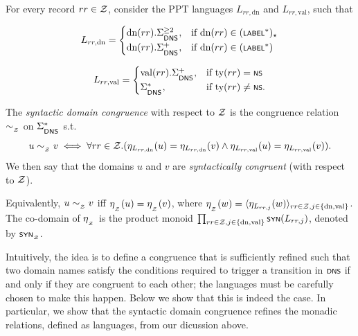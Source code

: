 \begin{definition}
	For every record $rr \in \cal Z$, consider the PPT languages $L_{rr,\text{dn}}$ and $L_{rr,\text{val}}$, such that
	\noindent\begin{minipage}{.5\linewidth}
		\begin{equation*}
			L_{rr,\text{dn}} = \begin{cases}
				\text{dn}(rr).\dnsAlph^{\geq 2}, & \text{if } \text{dn}(rr) \in (\scrsf{label}^*)_\star\\
				\text{dn}(rr).\dnsAlph^{+},  & \text{if } \text{dn}(rr) \in (\scrsf{label}^*)\\
			\end{cases}
		\end{equation*}
	\end{minipage}%
	\begin{minipage}{.5\linewidth}
		\begin{equation*}
			L_{rr,\text{val}} = \begin{cases}
				\text{val}(rr).\dnsAlph^+,  & \text{if } \text{ty}(rr) = \scrsf{ns}\\
				\dnsAlph^*,  & \text{if } \text{ty}(rr) \neq \scrsf{ns}.
			\end{cases}
		\end{equation*}
	\end{minipage}

	The \emph{syntactic domain congruence} with respect to $\cal Z$ is the congruence relation $\simZ$ on $\dnsAlph^*$ s.t.
	\[ u \simZ v \iff \forall rr \in \cal Z. (\synhom{L_{rr,\text{dn}}}(u) = \synhom{L_{rr, \text{dn}}}(v) \wedge \synhom{L_{rr,\text{val}}}(u) = \synhom{L_{rr, \text{val}}}(v)). \]
	We then say that the domains $u$ and $v$ are \emph{syntactically congruent} (with respect to $\cal Z$).
	
	Equivalently, $u \simZ v$ iff $\synhomZ (u) = \synhomZ (v)$, where $\synhomZ (w) = \tup{\synhom{L_{rr,j}}(w)}_{rr\in\cal Z,j\in \{\text{dn},\text{val}\}}$. The co-domain of $\synhomZ$ is the product monoid $\prod_{rr\in\cal Z,j\in \{\text{dn},\text{val}\}} \synmon{L_{rr,j}}$, denoted by $\synmonZ$. %
\end{definition}

Intuitively, the idea is to define a congruence that is sufficiently refined such that two domain names satisfy the conditions required to trigger a transition in $\scrsf{dns}$ if and only if they are congruent to each other; the languages must be carefully chosen to make this happen. Below we show that this is indeed the case. In particular, we show that the syntactic domain congruence refines the monadic relations, defined as languages, from our dicussion above.

